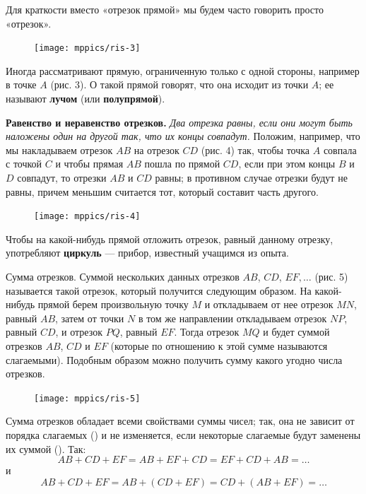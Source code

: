 \documentclass[oneside]{book}
\begin{document}
Для краткости вместо «отрезок прямой» мы будем часто говорить просто «отрезок».

\begin{figure}
\texttt{[image: mppics/ris-3]}
\caption{}
\end{figure}

Иногда рассматривают прямую, ограниченную только с одной стороны, например в точке $A$ (рис. 3).
О такой прямой говорят, что она исходит из точки $A$;
ее называют \textbf{лучом} (или \textbf{полупрямой}). %

\textbf{Равенство и неравенство отрезков.}
\emph{Два отрезка равны, если они могут быть наложены один на другой так, что их концы совпадут.}
Положим, например, что мы накладываем отрезок $AB$ на
отрезок $CD$ (рис. 4) так, чтобы точка $A$ совпала с точкой $C$ и чтобы прямая $AB$ пошла по прямой $CD$, если при этом концы $B$ и $D$ совпадут, то отрезки $AB$ и $CD$ равны;
в противном случае отрезки будут не равны, причем меньшим считается тот, который составит часть другого.


\begin{figure}[h]
\begin{center}
\texttt{[image: mppics/ris-4]}
\caption{}
\end{center}
\end{figure}


Чтобы на какой-нибудь прямой отложить отрезок, равный данному отрезку, употребляют \textbf{циркуль} — прибор, известный учащимся из опыта.

Сумма отрезков.
Суммой нескольких данных отрезков $AB$, $CD$, $EF,\dots$
(рис. 5) называется такой отрезок, который получится следующим образом.
На какой-нибудь прямой берем произвольную точку $M$ и откладываем от нее отрезок $MN$, равный $AB$, затем от точки $N$ в том же направлении откладываем отрезок $NP$, равный $CD$, и отрезок $PQ$, равный $EF$.
Тогда отрезок $MQ$ и будет суммой отрезков $AB$, $CD$ и $EF$ (которые по отношению к этой сумме называются слагаемыми).
Подобным образом можно получить сумму какого угодно числа отрезков.

\begin{figure}[h]
\begin{center}
\texttt{[image: mppics/ris-5]}
\caption{}
\end{center}
\end{figure}

Сумма отрезков обладает всеми свойствами суммы чисел;
так, она не зависит от порядка слагаемых () и не изменяется, если некоторые слагаемые будут заменены их суммой ().
Так:
\[AB+CD+EF=AB+EF+CD=EF+CD+AB=\dots\]
и
\[AB+CD+EF=AB+(CD+EF)=CD+(AB+EF)=\dots\]
\end{document}
